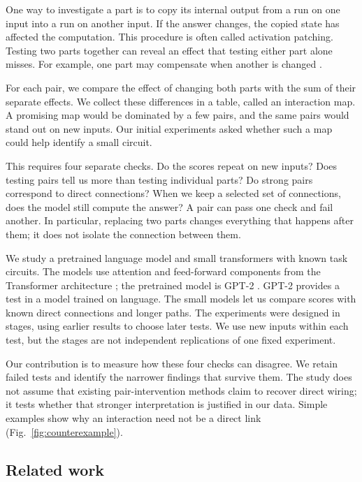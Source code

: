 \documentclass[11pt,letterpaper]{article}
\begin{document}
One way to investigate a part is to copy its internal output from a run on one
input into a run on another input. If the answer changes, the copied state
has affected the computation. This procedure is often called activation
patching. Testing two parts together can reveal an effect that testing either
part alone misses. For example, one part may compensate when another is changed
\cite{vaidyanathan2026mediators,gong2026coax}.

For each pair, we compare the effect of changing both parts with the sum of
their separate effects. We collect these differences in a table, called an
interaction map. A promising map would be dominated by a few pairs, and the
same pairs would stand out on new inputs. Our initial experiments asked
whether such a map could help identify a small circuit.

This requires four separate checks. Do the scores repeat on new inputs? Does
testing pairs tell us more than testing individual parts? Do strong pairs
correspond to direct connections? When we keep a selected set of connections,
does the model still compute the answer? A pair can pass one check and fail
another. In particular, replacing two parts changes everything that happens
after them; it does not isolate the connection between them.

We study a pretrained language model and small transformers with known task
circuits. The models use attention and feed-forward components from the
Transformer architecture \cite{vaswani2017attention}; the pretrained model
is GPT-2 \cite{radford2019language}. GPT-2 provides a test in a model trained on language. The small
models let us compare scores with known direct connections and longer paths.
The experiments were designed in stages, using earlier results to choose later
tests. We use new inputs within each test, but the stages are not independent
replications of one fixed experiment.

Our contribution is to measure how these four checks can disagree. We retain
failed tests and identify the narrower findings that survive them. The study
does not assume that existing pair-intervention methods claim to recover direct
wiring; it tests whether that stronger interpretation is justified in our data. Simple examples show why an interaction need not be a direct link (Fig.~\ref{fig:counterexample}).

\subsection*{Related work}
\end{document}
